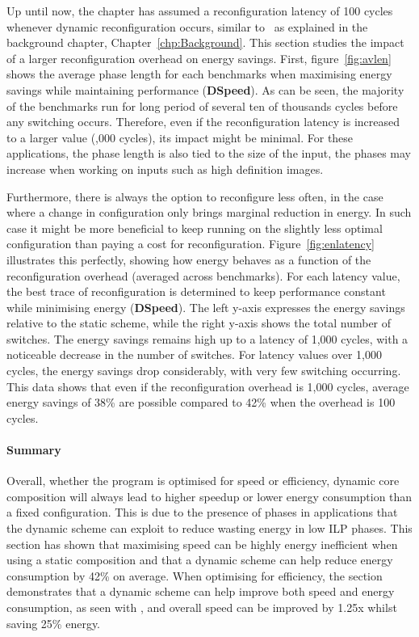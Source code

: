 Up until now, the chapter has assumed a reconfiguration latency of 100 cycles whenever dynamic reconfiguration occurs, similar to~\cite{pricopi2012bahurupi} as explained in the background chapter, Chapter~\ref{chp:Background}.
This section studies the impact of a larger reconfiguration overhead on energy savings.
First, figure~\ref{fig:avlen} shows the average phase length for each benchmarks when maximising energy savings while maintaining performance (\textbf{DSpeed}).
As can be seen, the majority of the benchmarks run for long period of several ten of thousands cycles before any switching occurs.
Therefore, even if the reconfiguration latency is increased to a larger value (,000 cycles), its impact might be minimal.
For these applications, the phase length is also tied to the size of the input, the phases may increase when working on inputs such as high definition images.

Furthermore, there is always the option to reconfigure less often, in the case where a change in configuration only brings marginal reduction in energy.
In such case it might be more beneficial to keep running on the slightly less optimal configuration than paying a cost for reconfiguration.
Figure~\ref{fig:enlatency} illustrates this perfectly, showing how energy behaves as a function of the reconfiguration overhead (averaged across benchmarks).
For each latency value, the best trace of reconfiguration is determined to keep performance constant while minimising energy (\textbf{DSpeed}).
The left y-axis expresses the energy savings relative to the static scheme, while the right y-axis shows the total number of switches.
The energy savings remains high up to a latency of 1,000 cycles, with a noticeable decrease in the number of switches.
For latency values over 1,000 cycles, the energy savings drop considerably, with very few switching occurring.
This data shows that even if the reconfiguration overhead is 1,000 cycles, average energy savings of 38\% are possible compared to 42\% when the overhead is 100 cycles.

\paragraph*{Summary}

Overall, whether the program is optimised for speed or efficiency, dynamic core composition will always lead to higher speedup or lower energy consumption than a fixed configuration.
This is due to the presence of phases in applications that the dynamic scheme can exploit to reduce wasting energy in low ILP phases.
This section has shown that maximising speed can be highly energy inefficient when using a static composition and that a dynamic scheme can help reduce energy consumption by 42\% on average.
When optimising for efficiency, the section demonstrates that a dynamic scheme can help improve both speed and energy consumption, as seen with , and overall speed can be improved by 1.25x whilst saving 25\% energy.

